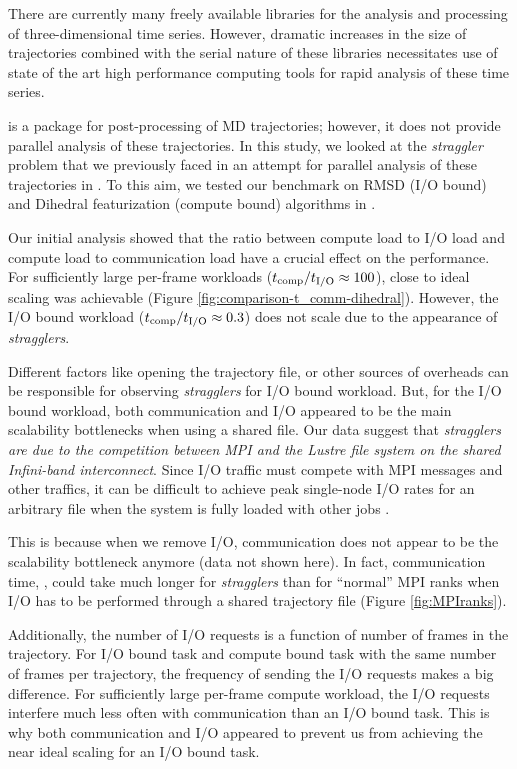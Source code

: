 \label{concl} 
There are currently many freely available libraries for the analysis and processing of three-dimensional time series.
However, dramatic increases in the size of trajectories combined with the serial nature of these libraries necessitates 
use of state of the art high performance computing tools for rapid analysis of these time series. 

 is a package for post-processing of MD trajectories; however, it does not provide parallel analysis of these trajectories.
In this study, we looked at the \emph{straggler} problem that we previously faced in an attempt for parallel analysis of these trajectories in  \cite{Khoshlessan:2017ab}.
To this aim, we tested our benchmark on RMSD (I/O bound) and Dihedral featurization (compute bound) algorithms in .

Our initial analysis showed that the ratio between compute load to I/O load and compute load to communication load have a crucial effect on the performance. 
For sufficiently large per-frame workloads (${t}_{\text{comp}}/{t}_{\text{I/O}} \approx 100$), close to ideal scaling was achievable (Figure \ref{fig:comparison-t_comm-dihedral}).
However, the I/O bound workload (${t}_{\text{comp}}/{t}_{\text{I/O}} \approx 0.3$) does not scale due to the appearance of \emph{stragglers}. 

Different factors like opening the trajectory file, or other sources of overheads can be responsible for observing \emph{stragglers} for I/O bound workload.
But, for the I/O bound workload, both communication and I/O appeared to be the main scalability bottlenecks when using a shared file.
Our data suggest that \emph{stragglers are due to the competition between MPI and the Lustre file system on the shared Infini-band interconnect}.  
Since I/O traffic must compete with MPI messages and other traffics, it can be difficult to achieve peak single-node I/O rates for an arbitrary file when the system is fully loaded with other jobs \cite{VMD2013, Kevin2018}. 

This is because when we remove I/O, communication does not appear to be the scalability bottleneck anymore (data not shown here).
In fact, communication time, \tcomm, could take
much longer for \emph{stragglers} than for ``normal'' MPI ranks when I/O has to be performed through a shared trajectory file (Figure \ref{fig:MPIranks}). 

Additionally, the number of I/O requests is a function of number of frames in the trajectory. 
For I/O bound task and compute bound task with the same number of frames per trajectory, the frequency of sending the I/O requests makes a big difference.
For sufficiently large per-frame compute workload, the I/O requests interfere much less often with communication than an I/O bound task.
This is why both communication and I/O appeared to prevent us from achieving the near ideal scaling for an I/O bound task.

